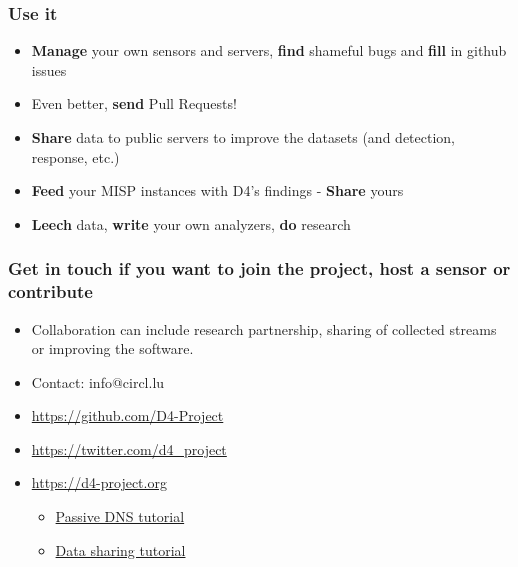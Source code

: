 \documentclass{beamer}
\begin{document}
\begin{frame}
\frametitle{Use it}
\begin{itemize}
\item {\bf Manage} your own sensors and servers, {\bf find} shameful bugs and
  {\bf fill} in github issues
\item Even better, {\bf send} Pull Requests! 
\item {\bf Share} data to public servers to improve the datasets (and detection,
  response, etc.)
\item {\bf Feed} your MISP instances with D4's findings - {\bf Share} yours
\item {\bf Leech} data, {\bf write} your own analyzers, {\bf do} research
\end{itemize}
\end{frame}

\begin{frame}
\frametitle{Get in touch if you want to join the project, host a sensor or contribute}
\begin{itemize}
\item Collaboration can include research partnership, sharing of collected streams or improving the software.
\item Contact: info@circl.lu
\item \url{https://github.com/D4-Project}
\item \url{https://twitter.com/d4_project}
\item \url{https://d4-project.org}
\begin{itemize}
  \item
    \href{https://d4-project.org/2019/05/28/passive-dns-tutorial.html}{Passive DNS tutorial}
  \item
    \href{https://d4-project.org/2019/06/17/sharing-between-D4-sensors.html}{Data
      sharing tutorial}
\end{itemize}
\end{itemize}
\end{frame}
\end{document}
